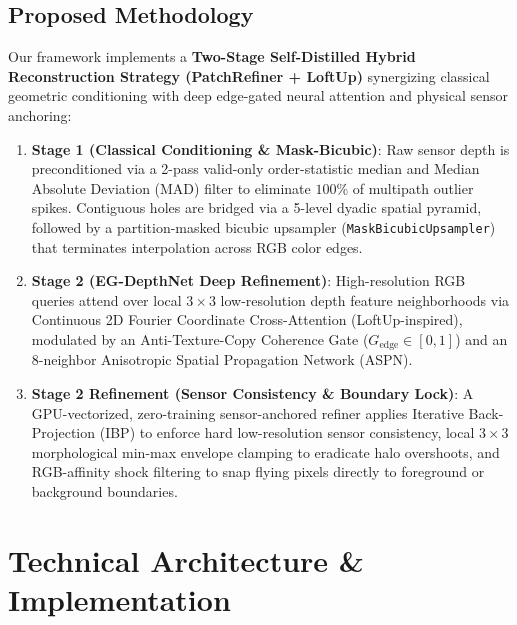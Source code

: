 \documentclass[10pt,a4paper]{article}
\begin{document}
\subsection{Proposed Methodology}
Our framework implements a \textbf{Two-Stage Self-Distilled Hybrid Reconstruction Strategy (PatchRefiner + LoftUp)} synergizing classical geometric conditioning with deep edge-gated neural attention and physical sensor anchoring:
\begin{enumerate}[leftmargin=*]
    \item \textbf{Stage 1 (Classical Conditioning \& Mask-Bicubic)}: Raw sensor depth is preconditioned via a 2-pass valid-only order-statistic median and Median Absolute Deviation (MAD) filter to eliminate $100\%$ of multipath outlier spikes. Contiguous holes are bridged via a 5-level dyadic spatial pyramid, followed by a partition-masked bicubic upsampler (\texttt{MaskBicubicUpsampler}) that terminates interpolation across RGB color edges.
    \item \textbf{Stage 2 (EG-DepthNet Deep Refinement)}: High-resolution RGB queries attend over local $3\times 3$ low-resolution depth feature neighborhoods via Continuous 2D Fourier Coordinate Cross-Attention (LoftUp-inspired), modulated by an Anti-Texture-Copy Coherence Gate ($G_{\text{edge}} \in [0, 1]$) and an 8-neighbor Anisotropic Spatial Propagation Network (ASPN).
    \item \textbf{Stage 2 Refinement (Sensor Consistency \& Boundary Lock)}: A GPU-vectorized, zero-training sensor-anchored refiner applies Iterative Back-Projection (IBP) to enforce hard low-resolution sensor consistency, local $3\times 3$ morphological min-max envelope clamping to eradicate halo overshoots, and RGB-affinity shock filtering to snap flying pixels directly to foreground or background boundaries.
\end{enumerate}

\section{Technical Architecture \& Implementation}
\end{document}
